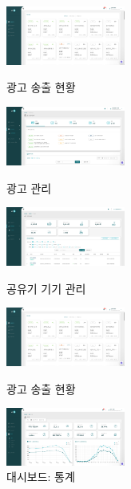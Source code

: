 \begin{itemize}[label=]
\begin{itemize}[label=]
		            \begin{figure}[!ht]
			            \begin{fullwidth}
				            \parbox{0.35\textwidth}{
					            \centering
					            \includegraphics[width=0.35\textwidth]{images/ad-fi-admin-ad-dashboard.png}
					            \caption*{광고 송출 현황}
				            }\qquad
				            \parbox{0.35\textwidth}{
					            \centering
					            \includegraphics[width=0.35\textwidth]{images/ad-fi-admin-ad-manage.png}
					            \caption*{광고 관리}
				            }\qquad
				            \parbox{0.35\textwidth}{
					            \centering
					            \includegraphics[width=0.35\textwidth]{images/ad-fi-admin-device-manage.png}
					            \caption*{공유기 기기 관리}
				            }\qquad
				            \parbox{0.35\textwidth}{
					            \centering
					            \includegraphics[width=0.35\textwidth]{images/ad-fi-admin-ad-dashboard.png}
					            \caption*{광고 송출 현황}
				            }
				            \parbox{0.35\textwidth}{
					            \centering
					            \includegraphics[width=0.35\textwidth]{images/ad-fi-admin-dashboard.png}
					            \caption*{대시보드: 통계}
}
\end{fullwidth}
\end{figure}
\end{itemize}
\end{itemize}
